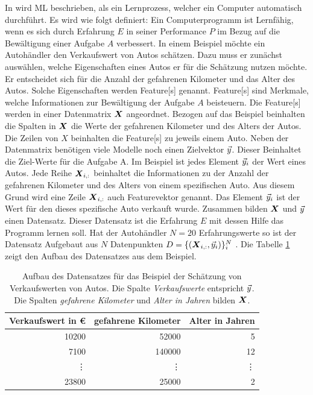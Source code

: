 In \cite{Mitchell.1997} wird \gls{ML} beschrieben, als ein Lernprozess, welcher ein Computer automatisch durchführt. Es wird wie folgt definiert: Ein Computerprogramm ist Lernfähig, wenn es sich durch Erfahrung \(E\) in seiner Performance \(P\) im Bezug auf die Bewältigung einer Aufgabe \(A\) verbessert. In einem Beispiel möchte ein Autohändler den Verkaufswert von Autos schätzen. Dazu muss er zunächst auswählen, welche Eigenschaften eines Autos er für die Schätzung nutzen möchte. Er entscheidet sich für die Anzahl der gefahrenen Kilometer und das Alter des Autos. Solche Eigenschaften werden \gls{Feature}[s] genannt. \gls{Feature}[s] sind Merkmale, welche Informationen zur Bewältigung der Aufgabe \(A\) beisteuern. Die \gls{Feature}[s] werden in einer \gls{Datenmatrix} \(\boldsymbol{X}\) angeordnet. Bezogen auf das Beispiel beinhalten die Spalten in \(\boldsymbol{X}\) die Werte der gefahrenen Kilometer und des Alters der Autos. Die Zeilen von \(X\) beinhalten die \gls{Feature}[s] zu jeweils einem Auto. Neben der \gls{Datenmatrix} benötigen viele Modelle noch einen \gls{Zielvektor} \(\vec{y}\). Dieser Beinhaltet die Ziel-Werte für die Aufgabe A. Im Beispiel ist jedes Element \(\vec{y}_i\) der Wert eines Autos. Jede Reihe \(\boldsymbol{X}_{i,:}\) beinhaltet die Informationen zu der Anzahl der gefahrenen Kilometer und des Alters von einem spezifischen Auto. Aus diesem Grund wird eine Zeile \(\boldsymbol{X}_{i,:}\) auch \gls{Featurevektor} genannt. Das Element \(\vec{y}_i\) ist der Wert für den dieses spezifische Auto verkauft wurde. Zusammen bilden \(\boldsymbol{X}\) und \(\vec{y}\) einen Datensatz. Dieser Datensatz ist die Erfahrung \(E\) mit dessen Hilfe das Programm lernen soll. Hat der Autohändler \(N=20\) Erfahrungswerte so ist der Datensatz Aufgebaut aus \(N\) Datenpunkten \(D = \{(\boldsymbol{X}_{i,:}, \vec{y}_i)\}_{i}^{N}\) \cite{Goodfellow.2016, Burkov.2019, ShalevShwartz.2014}. Die Tabelle \ref{tab:BspMLAuto} zeigt den Aufbau des Datensatzes aus dem Beispiel. 


\begin{table}
    \centering
    \begin{tabular}{|r|r|r|}
     \hline
        Verkaufswert in €   & gefahrene Kilometer   & Alter in Jahren\\
     \hline
        10200               & 52000                 & 5             \\
     \hline
        7100                & 140000                & 12            \\
     \hline
        \vdots              & \vdots                & \vdots        \\
     \hline
         23800              & 25000                 & 2             \\
      \hline
    \end{tabular}
    \caption{Aufbau des Datensatzes für das Beispiel der Schätzung von Verkaufswerten von Autos. Die Spalte \textit{Verkaufswerte} entspricht \(\vec{y}\). Die Spalten \textit{gefahrene Kilometer} und \textit{Alter in Jahren} bilden \(\boldsymbol{X}\). }
    \label{tab:BspMLAuto}
\end{table}

